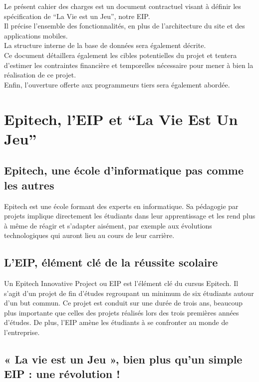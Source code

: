 \documentclass{life-fr}
\begin{document}
Le présent cahier des charges est un document contractuel visant à définir les
spécification de ``La Vie est un Jeu'', notre EIP.\\
Il précise l’ensemble des fonctionnalités, en plus de l’architecture du site et
des applications mobiles.\\
La structure interne de la base de données sera également décrite.\\
Ce document détaillera également les cibles potentielles du projet et tentera
d’estimer les contraintes financière et temporelles nécessaire pour mener à bien
la réalisation de ce projet.\\
Enfin, l’ouverture offerte aux programmeurs tiers sera également abordée.



\chapter{Epitech, l'EIP et ``La Vie Est Un Jeu''}

\section{Epitech, une école d'informatique pas comme les autres}

Epitech est une école formant des experts en informatique. Sa pédagogie par projets
implique directement les étudiants dans leur apprentissage et les rend plus à même
de réagir et s'adapter aisément, par exemple aux évolutions technologiques qui
auront lieu au cours de leur carrière.

\section{L'EIP, élément clé de la réussite scolaire}

Un Epitech Innovative Project ou EIP est l'élément clé du cursus Epitech. Il s'agit d'un projet de fin d'études regroupant un minimum de six étudiants autour d'un but commun. Ce projet est conduit sur une durée de trois ans, beaucoup plus importante que celles des projets réalisés lors des trois premières années d'études. De plus, l'EIP amène les étudiants à se confronter au monde de l'entreprise.

\section{« La vie est un Jeu », bien plus qu'un simple EIP : une révolution !}
\end{document}
